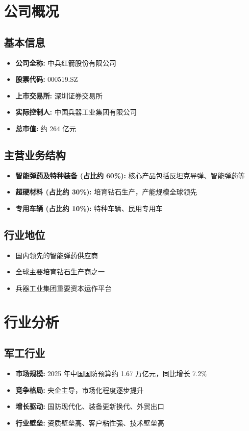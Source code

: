 \documentclass[a4paper,11pt]{article}
\begin{document}
\section{公司概况}

\subsection*{基本信息}
\begin{itemize}[leftmargin=*]
    \item \textbf{公司全称:} 中兵红箭股份有限公司
    \item \textbf{股票代码:} 000519.SZ
    \item \textbf{上市交易所:} 深圳证券交易所
    \item \textbf{实际控制人:} 中国兵器工业集团有限公司
    \item \textbf{总市值:} 约 264 亿元
\end{itemize}

\subsection*{主营业务结构}
\begin{itemize}[leftmargin=*]
    \item \textbf{智能弹药及特种装备 (占比约 60\%):} 核心产品包括反坦克导弹、智能弹药等
    \item \textbf{超硬材料 (占比约 30\%):} 培育钻石生产，产能规模全球领先
    \item \textbf{专用车辆 (占比约 10\%):} 特种车辆、民用专用车
\end{itemize}

\subsection*{行业地位}
\begin{itemize}[leftmargin=*]
    \item 国内领先的智能弹药供应商
    \item 全球主要培育钻石生产商之一
    \item 兵器工业集团重要资本运作平台
\end{itemize}

\newpage

\section{行业分析}

\subsection*{军工行业}
\begin{itemize}[leftmargin=*]
    \item \textbf{市场规模:} 2025 年中国国防预算约 1.67 万亿元，同比增长 7.2\%
    \item \textbf{竞争格局:} 央企主导，市场化程度逐步提升
    \item \textbf{增长驱动:} 国防现代化、装备更新换代、外贸出口
    \item \textbf{行业壁垒:} 资质壁垒高、客户粘性强、技术壁垒高
\end{itemize}
\end{document}
